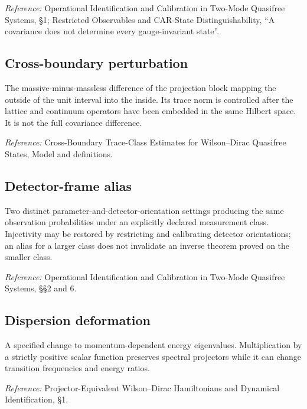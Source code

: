 \documentclass[
  10pt,
  a4paper,
]{article}
\begin{document}
\nopagebreak[4]

\emph{Reference:} Operational Identification and Calibration in Two-Mode Quasifree Systems, §1; Restricted Observables and CAR-State Distinguishability, ``A covariance does not determine every gauge-invariant state''.

\subsection{Cross-boundary perturbation}\label{cross-boundary-perturbation}

The massive-minus-massless difference of the projection block mapping the outside of the unit interval into the inside. Its trace norm is controlled after the lattice and continuum operators have been embedded in the same Hilbert space. It is not the full covariance difference.

\nopagebreak[4]

\emph{Reference:} Cross-Boundary Trace-Class Estimates for Wilson--Dirac Quasifree States, Model and definitions.

\subsection{Detector-frame alias}\label{detector-frame-alias}

Two distinct parameter-and-detector-orientation settings producing the same observation probabilities under an explicitly declared measurement class. Injectivity may be restored by restricting and calibrating detector orientations; an alias for a larger class does not invalidate an inverse theorem proved on the smaller class.

\nopagebreak[4]

\emph{Reference:} Operational Identification and Calibration in Two-Mode Quasifree Systems, §§2 and 6.

\subsection{Dispersion deformation}\label{dispersion-deformation}

A specified change to momentum-dependent energy eigenvalues. Multiplication by a strictly positive scalar function preserves spectral projectors while it can change transition frequencies and energy ratios.

\nopagebreak[4]

\emph{Reference:} Projector-Equivalent Wilson--Dirac Hamiltonians and Dynamical Identification, §1.
\end{document}
